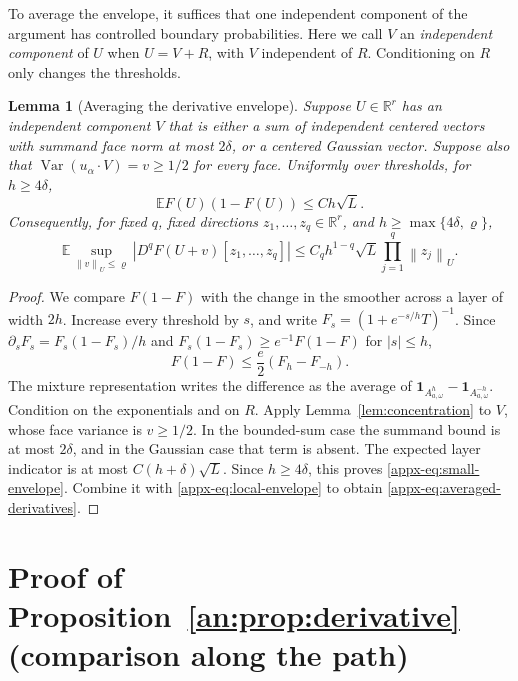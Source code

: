 \documentclass[11pt,letterpaper]{article}
\newtheorem{lemma}{Lemma}
\theoremstyle{remark}
\newcommand{\E}{\mathbb E}
\newcommand{\R}{\mathbb R}
\newcommand{\Var}{\operatorname{Var}}
\newcommand{\norm}[1]{\left\lVert#1\right\rVert}
\newcommand{\ind}{\mathbf 1}
\begin{document}
To average the envelope, it suffices that one independent component
of the argument has controlled boundary probabilities. Here we call
\(V\) an \emph{independent component} of \(U\) when \(U=V+R\), with
\(V\) independent of \(R\). Conditioning on \(R\) only changes the thresholds.
\begin{lemma}[Averaging the derivative envelope]\label{appx-lem:envelope}
Suppose \(U\in\R^r\) has an independent component \(V\) that is
either a sum of independent centered vectors with summand face norm
at most \(2\delta\), or a centered Gaussian vector. Suppose also
that \(\Var(u_\alpha\cdot V)=v\ge1/2\) for every face.
Uniformly over thresholds, for \(h\ge4\delta\),
\begin{equation}
 \E F(U)(1-F(U))\le Ch\sqrt L.
 \label{appx-eq:small-envelope}
\end{equation}
Consequently, for fixed \(q\), fixed directions
\(z_1,\ldots,z_q\in\R^r\), and \(h\ge\max\{4\delta,\varrho\}\),
\begin{equation}
 \E\sup_{\norm v_U\le\varrho}|D^qF(U+v)[z_1,\ldots,z_q]|
 \le C_qh^{1-q}\sqrt L\prod_{j=1}^q\norm{z_j}_U.
 \label{appx-eq:averaged-derivatives}
\end{equation}
\end{lemma}

\begin{proof}
We compare \(F(1-F)\) with the change in the smoother across a layer
of width \(2h\). Increase every threshold by \(s\), and write
\(F_s=(1+e^{-s/h}T)^{-1}\). Since
\(\partial_sF_s=F_s(1-F_s)/h\) and
\(F_s(1-F_s)\ge e^{-1}F(1-F)\) for \(|s|\le h\),
\[
 F(1-F)\le\frac e2(F_h-F_{-h}).
\]
The mixture representation writes the difference as the average of
\(\ind_{A_{a,\omega}^h}-\ind_{A_{a,\omega}^{-h}}\).
Condition on the exponentials and on \(R\). Apply
Lemma~\ref{lem:concentration} to \(V\), whose face variance is
\(v\ge1/2\). In the bounded-sum case the summand bound is at most
\(2\delta\), and in the Gaussian case that term is absent. The expected
layer indicator is at most \(C(h+\delta)\sqrt L\). Since \(h\ge4\delta\), this proves
\eqref{appx-eq:small-envelope}. Combine it with
\eqref{appx-eq:local-envelope} to obtain
\eqref{appx-eq:averaged-derivatives}.
\end{proof}

\section{Proof of Proposition~\ref*{an:prop:derivative} (comparison along the path)}
\label{appx-sec:support}
\end{document}
